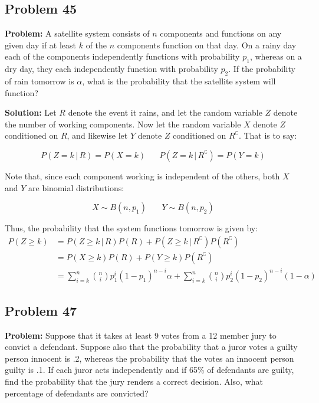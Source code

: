 \documentclass{article}
\newcommand*\pbar[0]{\,|\,}
\begin{document}
\subsection*{Problem 45}
\noindent\textbf{Problem:} A satellite system consists of $n$ components and functions on any given day if at least $k$ of the $n$ components function on that day. On a rainy day each of the components independently functions with probability $p_1$, whereas on a dry day, they each independently function with probability $p_2$. If the probability of rain tomorrow is $\alpha$, what is the probability that the satellite system will function? 
\bigskip

\noindent\textbf{Solution:} Let $R$ denote the event it rains, and let the random variable $Z$ denote the number of working components. Now let the random variable $X$ denote $Z$ conditioned on $R$, and likewise let $Y$ denote $Z$ conditioned on $R^\complement$. That is to say:

\begin{equation*}
    P(Z=k\pbar R)=P(X=k)\,\,\,\,\,\,\,\,\,\, P(Z=k\pbar R^\complement)=P(Y=k)
\end{equation*}

Note that, since each component working is independent of the others, both $X$ and $Y$ are binomial distributions:

\begin{equation*}
    X\sim B(n,p_1)\,\,\,\,\,\,\,\,\,\,\, Y\sim B(n,p_2)
\end{equation*}

Thus, the probability that the system functions tomorrow is given by:
\begin{align*}
    P(Z\ge k)&=P(Z\ge k\pbar R)P(R)+P(Z\ge k\pbar R^\complement)P(R^\complement)\\
    &=P(X\ge k)P(R)+P(Y\ge k)P(R^\complement)\tag{def. of $X$ and $Y$}\\
    &=\sum_{i=k}^n\binom{n}{i}p_1^i(1-p_1)^{n-i}\alpha+\sum_{i=k}^n\binom{n}{i}p_2^i(1-p_2)^{n-i}(1-\alpha)\tag{binomial distribution}
\end{align*}

\subsection*{Problem 47}
\noindent\textbf{Problem:} Suppose that it takes at least 9 votes from a 12 member jury to convict a defendant. Suppose also that the probability that a juror votes a guilty person innocent is .2, whereas the probability that the votes an innocent person guilty is .1. If each juror acts independently and if 65\% of defendants are guilty, find the probability that the jury renders a correct decision. Also, what percentage of defendants are convicted?
\bigskip
\end{document}
